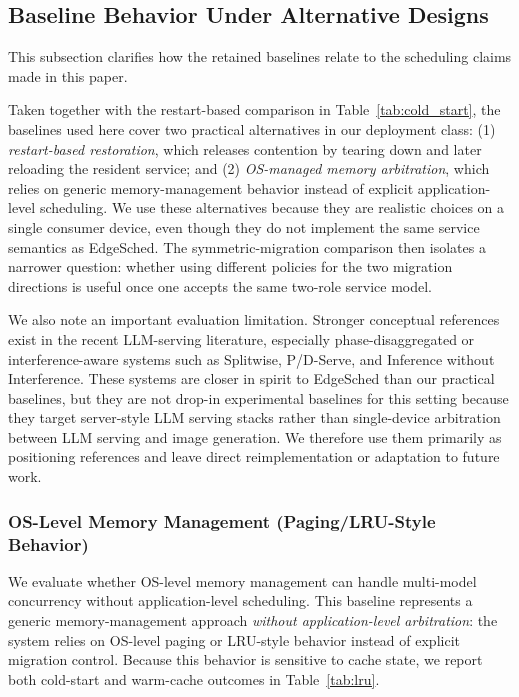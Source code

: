 \subsection{Baseline Behavior Under Alternative Designs}

This subsection clarifies how the retained baselines relate to the scheduling claims made in this paper.

Taken together with the restart-based comparison in Table~\ref{tab:cold_start}, the baselines used here cover two practical alternatives in our deployment class: (1) \emph{restart-based restoration}, which releases contention by tearing down and later reloading the resident service; and (2) \emph{OS-managed memory arbitration}, which relies on generic memory-management behavior instead of explicit application-level scheduling. We use these alternatives because they are realistic choices on a single consumer device, even though they do not implement the same service semantics as EdgeSched. The symmetric-migration comparison then isolates a narrower question: whether using different policies for the two migration directions is useful once one accepts the same two-role service model.

We also note an important evaluation limitation. Stronger conceptual references exist in the recent LLM-serving literature, especially phase-disaggregated or interference-aware systems such as Splitwise, P/D-Serve, and Inference without Interference. These systems are closer in spirit to EdgeSched than our practical baselines, but they are not drop-in experimental baselines for this setting because they target server-style LLM serving stacks rather than single-device arbitration between LLM serving and image generation. We therefore use them primarily as positioning references and leave direct reimplementation or adaptation to future work.

\subsubsection{OS-Level Memory Management (Paging/LRU-Style Behavior)}

We evaluate whether OS-level memory management can handle multi-model concurrency without application-level scheduling. This baseline represents a generic memory-management approach \emph{without application-level arbitration}: the system relies on OS-level paging or LRU-style behavior instead of explicit migration control. Because this behavior is sensitive to cache state, we report both cold-start and warm-cache outcomes in Table~\ref{tab:lru}.


